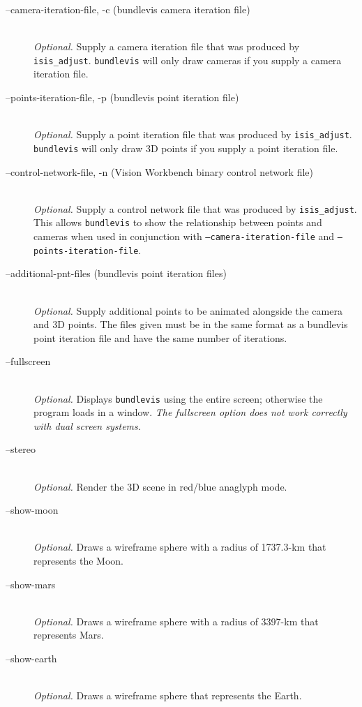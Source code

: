 \begin{description}

\item[--camera-iteration-file, -c \textnormal{\small{(bundlevis camera iteration file)}}] \hfill \\
  \emph{Optional.} Supply a camera iteration file that was produced by
       \texttt{isis\_adjust}.  \texttt{bundlevis} will only draw cameras
       if you supply a camera iteration file.

\item[--points-iteration-file, -p \textnormal{\small{(bundlevis point iteration file)}}] \hfill \\
  \emph{Optional.} Supply a point iteration file that was produced by
       \texttt{isis\_adjust}.  \texttt{bundlevis} will only draw 3D points
       if you supply a point iteration file.

\item[--control-network-file, -n \textnormal{\small{(Vision Workbench binary control network file)}}] \hfill \\
  \emph{Optional.} Supply a control network file that was produced by
       {\tt isis\_adjust}.  This allows {\tt bundlevis} to show the
       relationship between points and cameras when used in
       conjunction with \texttt{--camera-iteration-file} and
       \texttt{--points-iteration-file}.

\item[--additional-pnt-files \textnormal{\small{(bundlevis point iteration files)}}] \hfill \\
  \emph{Optional.} Supply additional points to be animated alongside
  the camera and 3D points.  The files given must be in the same
  format as a bundlevis point iteration file and have the same number
  of iterations.

\item[--fullscreen] \hfill \\
  \emph{Optional.} Displays \texttt{bundlevis} using the entire screen;
  otherwise the program loads in a window. \emph{The fullscreen option
    does not work correctly with dual screen systems.}

\item[--stereo] \hfill \\
  \emph{Optional.} Render the 3D scene in red/blue anaglyph mode.

\item[--show-moon] \hfill \\
  \emph{Optional.} Draws a wireframe sphere with a radius of 1737.3-km
  that represents the Moon.

\item[--show-mars] \hfill \\
  \emph{Optional.} Draws a wireframe sphere with a radius of 3397-km
  that represents Mars.

\item[--show-earth] \hfill \\
  \emph{Optional.} Draws a wireframe sphere that represents the Earth.

\end{description}

